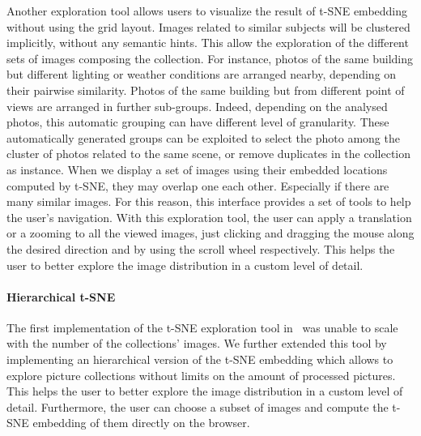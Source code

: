 Another exploration tool allows users to visualize the result of t-SNE embedding without using the grid layout. Images related to similar subjects will be clustered implicitly, without any semantic hints.
This allow the exploration of the different sets of images composing the collection. For instance, photos of the same building but different lighting or weather conditions are arranged nearby, depending on their pairwise similarity. Photos of the same building but from different point of views are arranged in further sub-groups. Indeed, depending on the analysed photos, this automatic grouping can have different level of granularity. These automatically generated groups can be exploited to select the  photo among the cluster of photos related to the same scene, or remove duplicates in the collection as instance.
When we display a set of images using their embedded locations computed by t-SNE, they may overlap one each other. Especially if there are many similar images. For this reason, this interface provides a set of tools to help the user's navigation.
With this exploration tool, the user can apply a translation or a zooming to all the viewed images, just clicking and dragging the mouse along the desired direction and by using the scroll wheel respectively. This helps the user to better explore the image distribution in a custom level of detail.


\paragraph{Hierarchical t-SNE}
The first implementation of the t-SNE exploration tool in~\cite{battiato2016social} was unable to scale with the number of the collections' images. We further extended this tool by implementing an hierarchical version of the t-SNE embedding which allows to explore picture collections without limits on the amount of processed pictures. 
This helps the user to better explore the image distribution in a custom level of detail. Furthermore, the user can choose a subset of images and compute the t-SNE embedding of them directly on the browser. %

